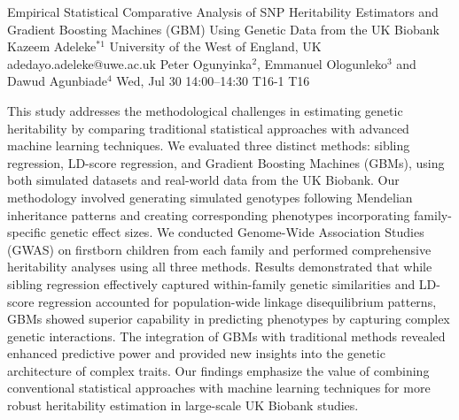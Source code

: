 \begin{talk}
  {Empirical Statistical Comparative Analysis of SNP Heritability Estimators and Gradient Boosting Machines (GBM) Using Genetic Data from the UK Biobank}%
  {Kazeem Adeleke$^{*1}$}%
  {University of the West of England, UK}%
  {adedayo.adeleke@uwe.ac.uk}%
  {Peter Ogunyinka$^{2}$, Emmanuel Ologunleko$^{3}$ and Dawud Agunbiade$^{4}$}%
  {}%
  {Wed, Jul 30 14:00--14:30}%
  {T16-1}%
  {T16}%
  
    
   
This study addresses the methodological challenges in estimating genetic heritability by comparing traditional statistical approaches with advanced machine learning techniques. We evaluated three distinct methods: sibling regression, LD-score regression, and Gradient Boosting Machines (GBMs), using both simulated datasets and real-world data from the UK Biobank. Our methodology involved generating simulated genotypes following Mendelian inheritance patterns and creating corresponding phenotypes incorporating family-specific genetic effect sizes. We conducted Genome-Wide Association Studies (GWAS) on firstborn children from each family and performed comprehensive heritability analyses using all three methods. Results demonstrated that while sibling regression effectively captured within-family genetic similarities and LD-score regression accounted for population-wide linkage disequilibrium patterns, GBMs showed superior capability in predicting phenotypes by capturing complex genetic interactions. The integration of GBMs with traditional methods revealed enhanced predictive power and provided new insights into the genetic architecture of complex traits. Our findings emphasize the value of combining conventional statistical approaches with machine learning techniques for more robust heritability estimation in large-scale UK Biobank studies.

\medskip


\end{talk}

